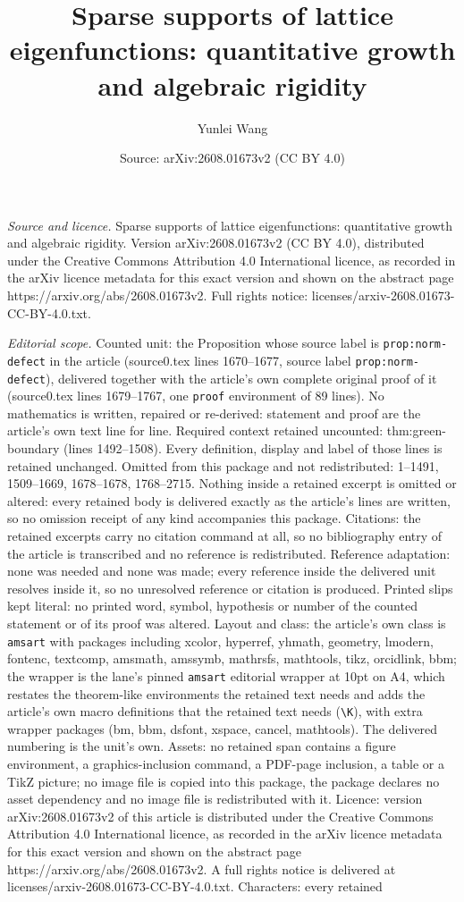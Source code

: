 \documentclass[10pt,a4paper]{amsart}
\title[Sparse supports of lattice eigenfunctions: quantitative grow]{Sparse supports of lattice eigenfunctions: quantitative growth and algebraic rigidity}
\author{Yunlei Wang}
\date{Source: arXiv:2608.01673v2 (CC BY 4.0)}
\begin{document}
\maketitle

\noindent\emph{Source and licence.} Sparse supports of lattice eigenfunctions: quantitative growth and algebraic rigidity. Version arXiv:2608.01673v2 (CC BY 4.0), distributed under the Creative Commons Attribution 4.0 International licence, as recorded in the arXiv licence metadata for this exact version and shown on the abstract page https://arxiv.org/abs/2608.01673v2. Full rights notice: licenses/arxiv-2608.01673-CC-BY-4.0.txt.\par\smallskip

\noindent\textit{Editorial scope.} Counted unit: the Proposition whose source label is \texttt{prop:norm-defect} in the article (source0.tex lines 1670--1677, source label \texttt{prop:norm-defect}), delivered together with the article's own complete original proof of it (source0.tex lines 1679--1767, one \texttt{proof} environment of 89 lines). No mathematics is written, repaired or re-derived: statement and proof are the article's own text line for line. Required context retained uncounted: thm:green-boundary (lines 1492--1508). Every definition, display and label of those lines is retained unchanged. Omitted from this package and not redistributed: 1--1491, 1509--1669, 1678--1678, 1768--2715. Nothing inside a retained excerpt is omitted or altered: every retained body is delivered exactly as the article's lines are written, so no omission receipt of any kind accompanies this package. Citations: the retained excerpts carry no citation command at all, so no bibliography entry of the article is transcribed and no reference is redistributed. Reference adaptation: none was needed and none was made; every reference inside the delivered unit resolves inside it, so no unresolved reference or citation is produced. Printed slips kept literal: no printed word, symbol, hypothesis or number of the counted statement or of its proof was altered. Layout and class: the article's own class is \texttt{amsart} with packages including xcolor, hyperref, yhmath, geometry, lmodern, fontenc, textcomp, amsmath, amssymb, mathrsfs, mathtools, tikz, orcidlink, bbm; the wrapper is the lane's pinned \texttt{amsart} editorial wrapper at 10pt on A4, which restates the theorem-like environments the retained text needs and adds the article's own macro definitions that the retained text needs (\texttt{\textbackslash K}), with extra wrapper packages (bm, bbm, dsfont, xspace, cancel, mathtools). The delivered numbering is the unit's own. Assets: no retained span contains a figure environment, a graphics-inclusion command, a PDF-page inclusion, a table or a TikZ picture; no image file is copied into this package, the package declares no asset dependency and no image file is redistributed with it. Licence: version arXiv:2608.01673v2 of this article is distributed under the Creative Commons Attribution 4.0 International licence, as recorded in the arXiv licence metadata for this exact version and shown on the abstract page https://arxiv.org/abs/2608.01673v2. A full rights notice is delivered at licenses/arxiv-2608.01673-CC-BY-4.0.txt. Characters: every retained 
\end{document}
